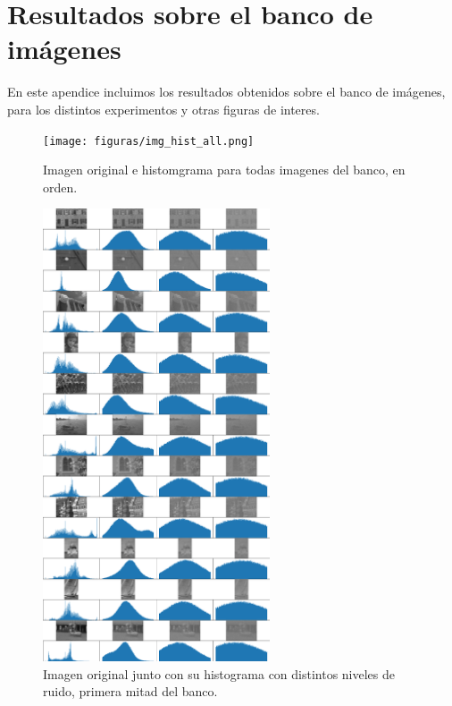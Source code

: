 \chapter{Resultados sobre el banco de im\'agenes}\label{appA}

En este apendice incluimos los resultados obtenidos sobre el banco de im\'agenes, para los distintos experimentos y otras figuras de interes. 

\begin{figure}
    \centering
    \texttt{[image: figuras/img\_hist\_all.png]}
    \caption{Imagen original e histomgrama para todas imagenes del banco, en orden.}
\end{figure}

\begin{figure}
    \centering
    \includegraphics[width=0.6\textwidth]{figuras/img_hist_noise_1.png}
    \caption{Imagen original junto con su histograma con distintos niveles de ruido, primera mitad del banco.}
\end{figure}

